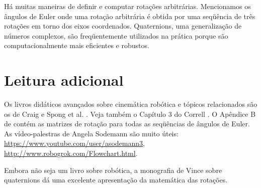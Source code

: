 Há muitas maneiras de definir e computar rotações arbitrárias. Mencionamos os ângulos de Euler onde uma rotação arbitrária é obtida por uma seqüência de três rotações em torno dos eixos coordenados. Quaternions, uma generalização de números complexos, são freqüentemente utilizados na prática porque são computacionalmente mais eficientes e robustos.

\section{Leitura adicional}

Os livros didáticos avançados sobre cinemática robótica e tópicos relacionados são os de Craig \cite{craig} e Spong et al. \cite{spong}. Veja também o Capítulo 3 do Correll \cite{correll}. O Apêndice B de \cite{craig} contém as matrizes de rotação para todas as seqüências de ângulos de Euler. As vídeo-palestras de Angela Sodemann são muito úteis:\\
\url{https://www.youtube.com/user/asodemann3},\\
\url{http://www.robogrok.com/Flowchart.html}.

Embora não seja um livro sobre robótica, a monografia de Vince sobre quaternions \cite{vince} dá uma excelente apresentação da matemática das rotações.
